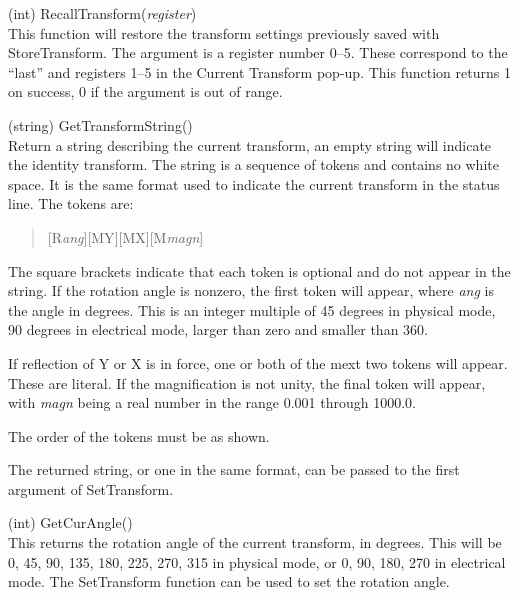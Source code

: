 \begin{description}
\item{(int) \vt RecallTransform({\it register\/})}\\
This function will restore the transform settings previously saved
with {\vt StoreTransform}.  The argument is a register number 0--5. 
These correspond to the ``last'' and registers 1--5 in the {\cb
Current Transform} pop-up.  This function returns 1 on success, 0 if
the argument is out of range.

\item{(string) \vt GetTransformString()}\\
Return a string describing the current transform, an empty string will
indicate the identity transform.  The string is a sequence of tokens
and contains no white space.  It is the same format used to indicate
the current transform in the {\Xic} status line.  The tokens are:

\begin{quote}
[{\vt R}{\it ang\/}][{\vt MY}][{\vt MX}][{\vt M}{\it magn\/}]
\end{quote}

The square brackets indicate that each token is optional and do not
appear in the string.  If the rotation angle is nonzero, the first
token will appear, where {\it ang} is the angle in degrees.  This is
an integer multiple of 45 degrees in physical mode, 90 degrees in
electrical mode, larger than zero and smaller than 360.

If reflection of Y or X is in force, one or both of the mext two
tokens will appear.  These are literal.  If the magnification is not
unity, the final token will appear, with {\it magn} being a real
number in the range 0.001 through 1000.0.
  
The order of the tokens must be as shown.

The returned string, or one in the same format, can be passed to
the first argument of {\vt SetTransform}.

\item{(int) \vt GetCurAngle()}\\
This returns the rotation angle of the current transform, in degrees. 
This will be 0, 45, 90, 135, 180, 225, 270, 315 in physical mode, or
0, 90, 180, 270 in electrical mode.  The {\vt SetTransform} function
can be used to set the rotation angle.


\end{description}
